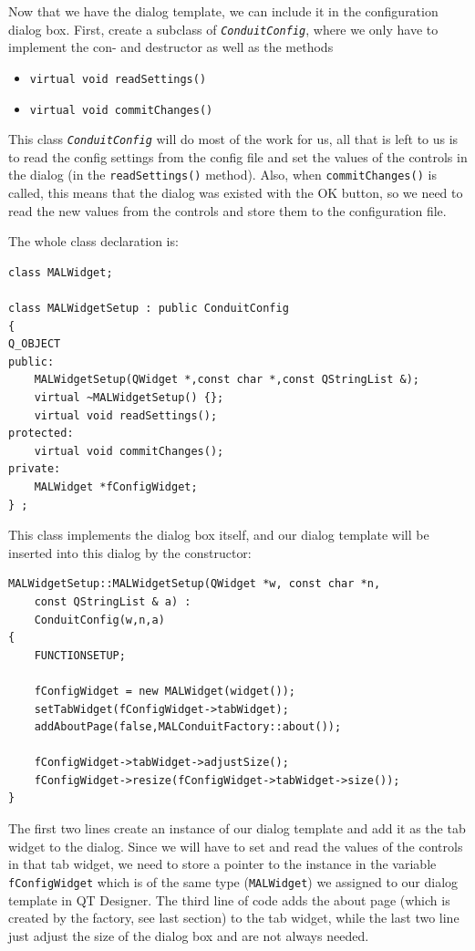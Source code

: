 \documentclass[10pt,a4paper]{article}
\newcommand{\code}[1]{{\small\texttt{#1}}}
\newcommand{\class}[1]{{\small\em\texttt{#1}}}
\begin{document}
Now that we have the dialog template, we can include it in the configuration dialog box. 
First, create a subclass of \class{ConduitConfig}, where we only have to implement the con- and 
destructor as well as the methods
\begin{itemize}
\item \code{virtual void readSettings()} 
\item \code{virtual void commitChanges()}
\end{itemize}
This class \class{ConduitConfig} will do most of the work for us, all 
that is left to us is to read the config settings from the config file 
and set the values of the controls in the dialog (in the 
\code{readSettings()} method). Also, when \code{commitChanges()} is 
called, this means that the dialog was existed with the OK button, so 
we need to read the new values from the controls and store them to the 
configuration file.

The whole class declaration is:
{\footnotesize\begin{verbatim}
class MALWidget;

class MALWidgetSetup : public ConduitConfig 
{
Q_OBJECT
public:
    MALWidgetSetup(QWidget *,const char *,const QStringList &);
    virtual ~MALWidgetSetup() {};
    virtual void readSettings();
protected:
    virtual void commitChanges();
private:
    MALWidget *fConfigWidget;
} ;
\end{verbatim}
}

This class implements the dialog box itself, and our dialog template 
will be inserted into this dialog by the constructor:
{\footnotesize\begin{verbatim}
MALWidgetSetup::MALWidgetSetup(QWidget *w, const char *n,
    const QStringList & a) :
    ConduitConfig(w,n,a)
{
    FUNCTIONSETUP;

    fConfigWidget = new MALWidget(widget());
    setTabWidget(fConfigWidget->tabWidget);
    addAboutPage(false,MALConduitFactory::about());

    fConfigWidget->tabWidget->adjustSize();
    fConfigWidget->resize(fConfigWidget->tabWidget->size());
}
\end{verbatim}
}

The first two lines create an instance of our dialog template and add it 
as the tab widget to the dialog. Since we will have to set and read the 
values of the controls in that tab widget, we need to store a pointer to 
the instance in the variable \code{fConfigWidget} which is of the same type 
(\code{MALWidget}) we assigned to our dialog template in QT Designer. The 
third line of code adds the about page (which is created by the factory, 
see last section) to the tab widget, while the last two line just adjust 
the size of the dialog box and are not always needed.
\end{document}
